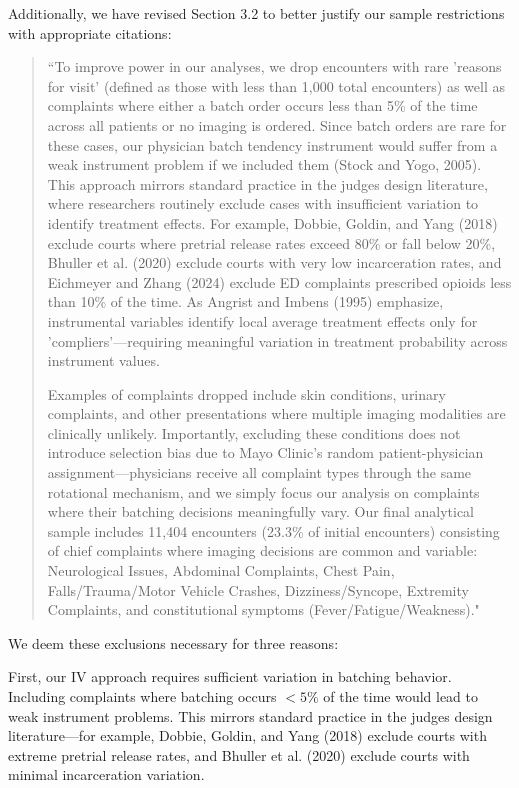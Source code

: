 \documentclass[11pt]{article}
\newcommand{\1}{\hbox{\rm 1\kern-.35em 1}}
\begin{document}
{{{{{Additionally, we have revised Section 3.2 to better justify our sample restrictions with appropriate citations:

\begin{quote}
``To improve power in our analyses, we drop encounters with rare 'reasons for visit' (defined as those with less than 1,000 total encounters) as well as complaints where either a batch order occurs less than 5\% of the time across all patients or no imaging is ordered. Since batch orders are rare for these cases, our physician batch tendency instrument would suffer from a weak instrument problem if we included them (Stock and Yogo, 2005). This approach mirrors standard practice in the judges design literature, where researchers routinely exclude cases with insufficient variation to identify treatment effects. For example, Dobbie, Goldin, and Yang (2018) exclude courts where pretrial release rates exceed 80\% or fall below 20\%, Bhuller et al. (2020) exclude courts with very low incarceration rates, and Eichmeyer and Zhang (2024) exclude ED complaints prescribed opioids less than 10\% of the time. As Angrist and Imbens (1995) emphasize, instrumental variables identify local average treatment effects only for 'compliers'—requiring meaningful variation in treatment probability across instrument values.

Examples of complaints dropped include skin conditions, urinary complaints, and other presentations where multiple imaging modalities are clinically unlikely. Importantly, excluding these conditions does not introduce selection bias due to Mayo Clinic's random patient-physician assignment—physicians receive all complaint types through the same rotational mechanism, and we simply focus our analysis on complaints where their batching decisions meaningfully vary. Our final analytical sample includes 11,404 encounters (23.3\% of initial encounters) consisting of chief complaints where imaging decisions are common and variable: Neurological Issues, Abdominal Complaints, Chest Pain, Falls/Trauma/Motor Vehicle Crashes, Dizziness/Syncope, Extremity Complaints, and constitutional symptoms (Fever/Fatigue/Weakness)."
\end{quote}

We deem these exclusions necessary for three reasons:

First, our IV approach requires sufficient variation in batching behavior. Including complaints where batching occurs $<5\%$ of the time would lead to weak instrument problems. This mirrors standard practice in the judges design literature---for example, Dobbie, Goldin, and Yang (2018) exclude courts with extreme pretrial release rates, and Bhuller et al. (2020) exclude courts with minimal incarceration variation.

}}}}}
\end{document}
